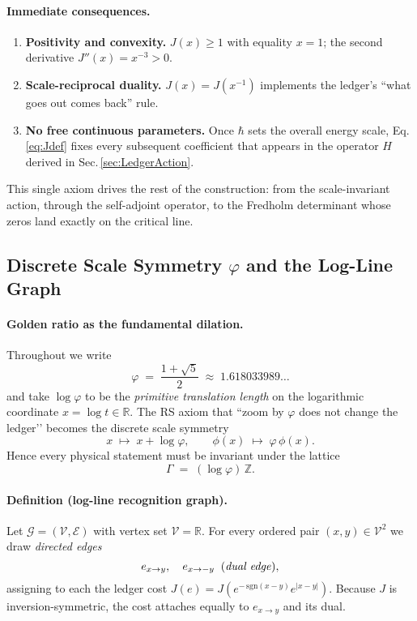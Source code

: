 \documentclass[11pt]{article}
\begin{document}
\paragraph{Immediate consequences.}
\begin{enumerate}
\item \textbf{Positivity and convexity.}\;
      \(J(x)\ge1\) with equality \(x=1\); the second derivative
      \(J''(x)=x^{-3}>0\).
\item \textbf{Scale-reciprocal duality.}\;
      \(J(x)=J(x^{-1})\) implements the ledger’s
      “what goes out comes back” rule.
\item \textbf{No free continuous parameters.}\;
      Once \(\hbar\) sets the overall energy scale,
      Eq.\,\eqref{eq:Jdef} fixes every subsequent coefficient that
      appears in the operator $H$ derived in
      Sec.\,\ref{sec:LedgerAction}.
\end{enumerate}

\vspace{0.5em}
\noindent
This single axiom drives the rest of the construction: from the
scale-invariant action, through the self-adjoint operator, to the
Fredholm determinant whose zeros land exactly on the critical line.

\subsection{Discrete Scale Symmetry $\varphi$ and the Log-Line Graph}
\label{sec:LogLine}

\paragraph{Golden ratio as the fundamental dilation.}
Throughout we write
\[
   \varphi \;=\;\frac{1+\sqrt5}{2}\;\approx\;1.618033989\ldots
\]
and take $\log\varphi$ to be the \emph{primitive translation length} on
the logarithmic coordinate $x=\log t\in\mathbb R$.
The RS axiom that “zoom by $\varphi$ does not change the ledger’’
becomes the discrete scale symmetry
\begin{equation}
\label{eq:dilation}
   x \;\longmapsto\; x+\log\varphi,
   \qquad
   \phi(x) \;\longmapsto\; \varphi\,\phi(x).
\end{equation}
Hence every physical statement must be invariant under the lattice
\[
   \Gamma \;=\; (\log\varphi)\,\mathbb Z.
\]

\paragraph{Definition (log-line recognition graph).}
Let $\mathcal G=(\mathcal V,\mathcal E)$ with vertex set
$\mathcal V=\mathbb R$.  
For every ordered pair $(x,y)\in\mathcal V^{2}$ we draw
\emph{directed edges}
\[
   e_{x\to y},\quad
   e_{x\to -y}\;\;\text{(\emph{dual edge})},
\]
assigning to each the ledger cost $J(e)=J(e^{-\,\mathrm{sgn}(x-y)}e^{|x-y|})$.
Because $J$ is inversion-symmetric, the cost attaches equally to
$e_{x\to y}$ and its dual.
\end{document}
